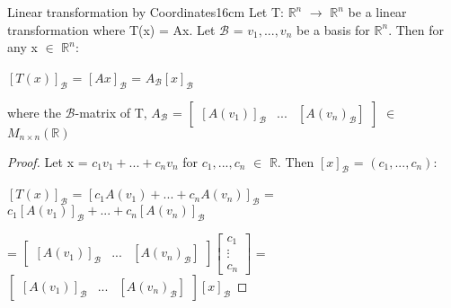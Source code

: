     \vspace{0.5cm}



    \begin{wtheorem}{Linear transformation by Coordinates}{16cm}
        Let T: $\mathbb{R}^n$ $\rightarrow$ $\mathbb{R}^n$
        be a linear transformation where T(x) = Ax.
        Let $\mathcal{B}$ = $v_1,...,v_n$
        be a basis for $\mathbb{R}^n$.
        Then for any x $\in$ $\mathbb{R}^n$:

        \hspace{0.5cm}
        $[T(x)]_{\mathcal{B}}$
        = $[Ax]_{\mathcal{B}}$
        = $A_{\mathcal{B}}[x]_{\mathcal{B}}$

        where the {\color{lblue} $\mathcal{B}$-matrix of T}, $A_{\mathcal{B}}$ =
        $\begin{bmatrix}
            [A(v_1)]_{\mathcal{B}} & ... & [A(v_n)_{\mathcal{B}}]
        \end{bmatrix}$ $\in$ $M_{n \times n}(\mathbb{R})$
    \end{wtheorem}

    \begin{proof}
        Let x = $c_1v_1 + ... + c_nv_n$ for $c_1,...,c_n$ $\in$ $\mathbb{R}$.
        Then $[x]_{\mathcal{B}}$ = $(c_1,...,c_n)$:

        \hspace{0.5cm}
        $[T(x)]_{\mathcal{B}}$
        = $[c_1A(v_1) + ... + c_nA(v_n)]_{\mathcal{B}}$
        = $c_1[A(v_1)]_{\mathcal{B}} + ... + c_n[A(v_n)]_{\mathcal{B}}$
        
        \hspace{1.9cm}
        =
        $\begin{bmatrix}
            [A(v_1)]_{\mathcal{B}} & ... & [A(v_n)_{\mathcal{B}}]
        \end{bmatrix}
        \begin{bmatrix}
            c_1 \\
            \vdots \\
            c_n
        \end{bmatrix}$ =
        $\begin{bmatrix}
            [A(v_1)]_{\mathcal{B}} & ... & [A(v_n)_{\mathcal{B}}]
        \end{bmatrix}
        [x]_{\mathcal{B}}$  
    \end{proof}

    \vspace{0.5cm}




